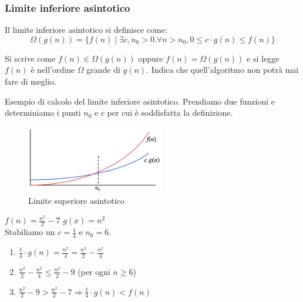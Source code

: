 \subsubsection{Limite inferiore asintotico}
\begin{definition}
	Il limite inferiore asintotico si definisce come:
	\begin{equation}
		\Omega(g(n)) = \{f(n) \mid \exists c, n_0 > 0 . \forall n > n_0, 0 \leq c \cdot g(n) \leq f(n) \}
	\end{equation}
\end{definition}
\noindent Si scrive come $f(n) \in \Omega(g(n))$ oppure $f(n) = \Omega(g(n))$ e si legge $f(n)$ è nell'ordine $\Omega$ grande di $g(n)$. Indica che quell'algoritmo non potrà mai fare di meglio.
\begin{example}
	Esempio di calcolo del limite inferiore asintotico. Prendiamo due funzioni e determiniamo i punti $n_0$ e $c$ per cui è soddisfatta la definizione.
\end{example}
\begin{figure}
	\vspace{-15pt}
	\centering
	\includegraphics[width=6cm]{images/limite-inferiore-asintotico.png}
	\vspace{-5pt}
	\caption{Limite superiore asintotico}
\end{figure}

$f(n) = \frac{n^2}{2}-7$ \: \: \: $g(x)=n^2$\\
Stabiliamo un $c = \frac{1}{4}$ e $n_0 = 6$.
\begin{enumerate}
	\item $\frac{1}{4} \cdot g(n) = \frac{n^2}{4} = \frac{n^2}{2} - \frac{n^2}{4}$
	\item $\frac{n^2}{2} - \frac{n^2}{4} \leq \frac{n^2}{2} - 9 $ (per ogni $n \geq 6$)
	\item $\frac{n^2}{2} - 9 > \frac{n^2}{2}-7 \Longrightarrow \frac{1}{4} \cdot g(n) < f(n)$
\end{enumerate}

